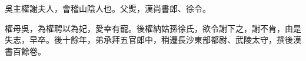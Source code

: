 \begin{pinyinscope}
 
 
 吳主權謝夫人，會稽山陰人也。父㷡，漢尚書郎、徐令。
 
 
 權母吳，為權聘以為妃，愛幸有寵。後權納姑孫徐氏，欲令謝下之，謝不肯，由是失志，早卒。後十餘年，弟承拜五官郎中，稍遷長沙東部都尉、武陵太守，撰後漢書百餘卷。
 
 
\end{pinyinscope}